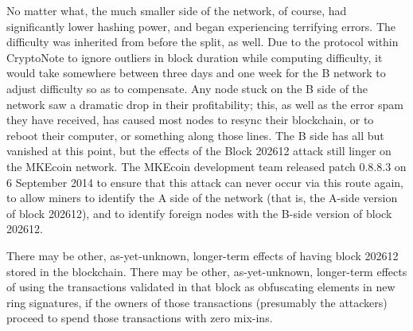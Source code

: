 \documentclass{mrl}
\begin{document}
No matter what, the much smaller side of the network, of course, had significantly lower hashing power, and began experiencing terrifying errors. The difficulty was inherited from before the split, as well. Due to the protocol within CryptoNote to ignore outliers in block duration while computing difficulty, it would take somewhere between three days and one week for the B network to adjust difficulty so as to compensate. Any node stuck on the B side of the network saw a dramatic drop in their profitability; this, as well as the error spam they have received, has caused most nodes to resync their blockchain, or to reboot their computer, or something along those lines. The B side has all but vanished at this point, but the effects of the Block 202612 attack still linger on the MKEcoin network. The MKEcoin development team released patch 0.8.8.3 on 6 September 2014 to ensure that this attack can never occur via this route again, to allow miners to identify the A side of the network (that is, the A-side version of block 202612), and to identify foreign nodes with the B-side version of block 202612.

There may be other, as-yet-unknown, longer-term effects of having block 202612 stored in the blockchain. There may be other, as-yet-unknown, longer-term effects of using the transactions validated in that block as obfuscating elements in new ring signatures, if the owners of those transactions (presumably the attackers) proceed to spend those transactions with zero mix-ins.

\begin{backmatter}


\end{backmatter}
\end{document}
